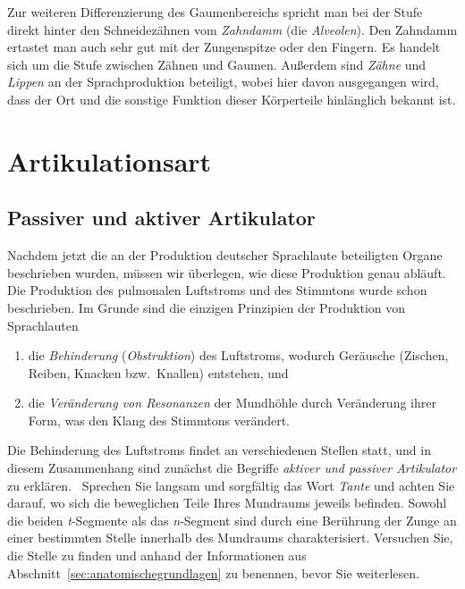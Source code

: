 Zur weiteren Differenzierung des Gaumenbereichs spricht man bei der Stufe direkt hinter den Schneidezähnen vom \textit{Zahndamm} (die \textit{Alveolen}).
Den Zahndamm ertastet man auch sehr gut mit der Zungenspitze oder den Fingern.
Es handelt sich um die Stufe zwischen Zähnen und Gaumen.
Außerdem sind \textit{Zähne} und \textit{Lippen} an der Sprachproduktion beteiligt, wobei hier davon ausgegangen wird, dass der Ort und die sonstige Funktion dieser Körperteile hinlänglich bekannt ist.

\section{Artikulationsart}

\label{sec:artikulationsart}

\subsection{Passiver und aktiver Artikulator}

\label{sec:passiveraktiverartikulator}

Nachdem jetzt die an der Produktion deutscher Sprachlaute beteiligten Organe beschrieben wurden, müssen wir überlegen, wie diese Produktion genau abläuft.
Die Produktion des pulmonalen Luftstroms und des Stimmtons wurde schon beschrieben.
Im Grunde sind die einzigen Prinzipien der Produktion von Sprachlauten

\begin{enumerate}\Lf
  \item die \textit{Behinderung} (\textit{Obstruktion}) des Luftstroms, wodurch Geräusche (Zischen, Reiben, Knacken bzw.\ Knallen) entstehen, und
  \item die \textit{Veränderung von Resonanzen} der Mundhöhle durch Veränderung ihrer Form, was den Klang des Stimmtons verändert.
\end{enumerate}

Die Behinderung des Luftstroms findet an verschiedenen Stellen statt, und in diesem Zusammenhang sind zunächst die Begriffe \textit{aktiver und passiver Artikulator} zu erklären.
\TuBegin~Sprechen Sie langsam und sorgfältig das Wort \textit{Tante} und achten Sie darauf, wo sich die beweglichen Teile Ihres Mundraums jeweils befinden.
Sowohl die beiden \textit{t}-Segmente als das \textit{n}-Segment sind durch eine Berührung der Zunge an einer bestimmten Stelle innerhalb des Mundraums charakterisiert.
Versuchen Sie, die Stelle zu finden und anhand der Informationen aus Abschnitt~\ref{sec:anatomischegrundlagen} zu benennen, bevor Sie weiterlesen.

